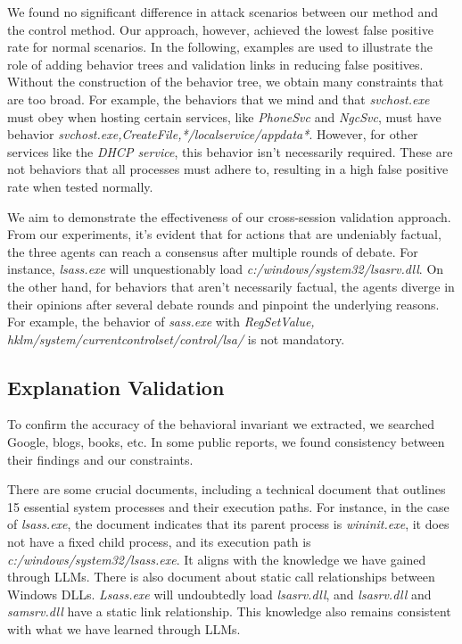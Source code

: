 We found no significant difference in attack scenarios between our method and the control method. Our approach, however, achieved the lowest false positive rate for normal scenarios.
In the following, examples are used to illustrate the role of adding behavior trees and validation links in reducing false positives.
Without the construction of the behavior tree, we obtain many constraints that are too broad.
For example, the behaviors that we mind and that \textit{svchost.exe} must obey when hosting certain services, like \textit{PhoneSvc} and \textit{NgcSvc}, must have behavior \textit{svchost.exe,CreateFile,*/localservice/appdata*}. However, for other services like the \textit{DHCP service}, this behavior isn't necessarily required. These are not behaviors that all processes must adhere to, resulting in a high false positive rate when tested normally. 

We aim to demonstrate the effectiveness of our cross-session validation approach. From our experiments, it's evident that for actions that are undeniably factual, the three agents can reach a consensus after multiple rounds of debate. For instance, \textit{lsass.exe} will unquestionably load \textit{c:/windows/system32/lsasrv.dll}. On the other hand, for behaviors that aren't necessarily factual, the agents diverge in their opinions after several debate rounds and pinpoint the underlying reasons. For example, the behavior of \textit{sass.exe} with \textit{RegSetValue, hklm/system/currentcontrolset/control/lsa/} is not mandatory.



\subsection{Explanation Validation}
\label{sec-explanation-val}
To confirm the accuracy of the behavioral invariant we extracted, we searched Google, blogs, books, etc. In some public reports, we found consistency between their findings and our constraints.

There are some crucial documents\cite{nasbench}, including a technical document that outlines 15 essential system processes and their execution paths. For instance, in the case of \textit{lsass.exe}, the document indicates that its parent process is \textit{wininit.exe}, it does not have a fixed child process, and its execution path is \textit{c:/windows/system32/lsass.exe}. It aligns with the knowledge we have gained through LLMs.
There is also document\cite{windows10dll} about static call relationships between Windows DLLs. \textit{Lsass.exe} will undoubtedly load \textit{lsasrv.dll}, and \textit{lsasrv.dll} and \textit{samsrv.dll} have a static link relationship. This knowledge also remains consistent with what we have learned through LLMs.


